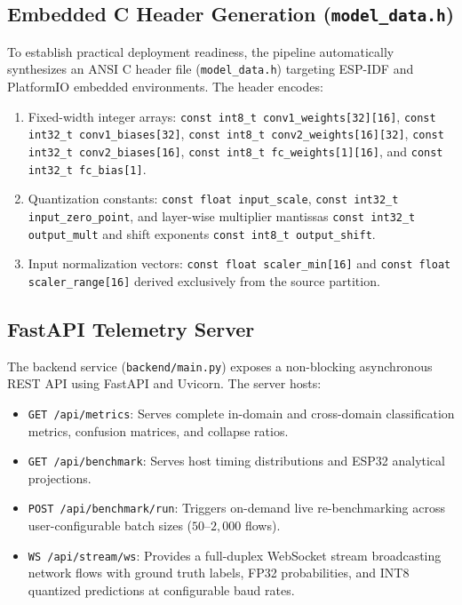\subsection{Embedded C Header Generation (\texttt{model\_data.h})}
To establish practical deployment readiness, the pipeline automatically synthesizes an ANSI C header file (\texttt{model\_data.h}) targeting ESP-IDF and PlatformIO embedded environments. The header encodes:
\begin{enumerate}
    \item Fixed-width integer arrays: \texttt{const int8\_t conv1\_weights[32][16]}, \texttt{const int32\_t conv1\_biases[32]}, \texttt{const int8\_t conv2\_weights[16][32]}, \texttt{const int32\_t conv2\_biases[16]}, \texttt{const int8\_t fc\_weights[1][16]}, and \texttt{const int32\_t fc\_bias[1]}.
    \item Quantization constants: \texttt{const float input\_scale}, \texttt{const int32\_t input\_zero\_point}, and layer-wise multiplier mantissas \texttt{const int32\_t output\_mult} and shift exponents \texttt{const int8\_t output\_shift}.
    \item Input normalization vectors: \texttt{const float scaler\_min[16]} and \texttt{const float scaler\_range[16]} derived exclusively from the source partition.
\end{enumerate}

\subsection{FastAPI Telemetry Server}
The backend service (\texttt{backend/main.py}) exposes a non-blocking asynchronous REST API using FastAPI and Uvicorn. The server hosts:
\begin{itemize}
    \item \texttt{GET /api/metrics}: Serves complete in-domain and cross-domain classification metrics, confusion matrices, and collapse ratios.
    \item \texttt{GET /api/benchmark}: Serves host timing distributions and ESP32 analytical projections.
    \item \texttt{POST /api/benchmark/run}: Triggers on-demand live re-benchmarking across user-configurable batch sizes ($50\text{--}2,000$ flows).
    \item \texttt{WS /api/stream/ws}: Provides a full-duplex WebSocket stream broadcasting network flows with ground truth labels, FP32 probabilities, and INT8 quantized predictions at configurable baud rates.
\end{itemize}

